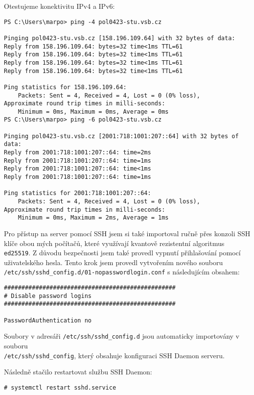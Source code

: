 Otestujeme konektivitu IPv4 a IPv6:

\begin{verbatim}
PS C:\Users\marpo> ping -4 pol0423-stu.vsb.cz

Pinging pol0423-stu.vsb.cz [158.196.109.64] with 32 bytes of data:
Reply from 158.196.109.64: bytes=32 time<1ms TTL=61
Reply from 158.196.109.64: bytes=32 time<1ms TTL=61
Reply from 158.196.109.64: bytes=32 time<1ms TTL=61
Reply from 158.196.109.64: bytes=32 time<1ms TTL=61

Ping statistics for 158.196.109.64:
    Packets: Sent = 4, Received = 4, Lost = 0 (0% loss),
Approximate round trip times in milli-seconds:
    Minimum = 0ms, Maximum = 0ms, Average = 0ms
PS C:\Users\marpo> ping -6 pol0423-stu.vsb.cz

Pinging pol0423-stu.vsb.cz [2001:718:1001:207::64] with 32 bytes of data:
Reply from 2001:718:1001:207::64: time=2ms
Reply from 2001:718:1001:207::64: time=1ms
Reply from 2001:718:1001:207::64: time<1ms
Reply from 2001:718:1001:207::64: time=1ms

Ping statistics for 2001:718:1001:207::64:
    Packets: Sent = 4, Received = 4, Lost = 0 (0% loss),
Approximate round trip times in milli-seconds:
    Minimum = 0ms, Maximum = 2ms, Average = 1ms
\end{verbatim}

Pro přístup na server pomocí SSH jsem si také importoval ručně
přes konzoli SSH klíče obou mých počítačů, které využívají kvantově
rezistentní algoritmus \texttt{ed25519}. Z důvodu bezpečnosti jsem
také provedl vypnutí přihlašování pomocí uživatelského hesla.
Tento krok jsem provedl vytvořením nového souboru
\texttt{/etc/ssh/sshd\_config.d/01-nopasswordlogin.conf}
s následujícím obsahem:

\newpage

\begin{verbatim}
#################################################
# Disable password logins
#################################################

PasswordAuthentication no
\end{verbatim}

Soubory v adresáři \texttt{/etc/ssh/sshd\_config.d} jsou automaticky
importovány v souboru\\
\texttt{/etc/ssh/sshd\_config}, který obsahuje konfiguraci SSH Daemon
serveru.

Následně stačilo restartovat službu SSH Daemon:

\begin{verbatim}
# systemctl restart sshd.service
\end{verbatim}

